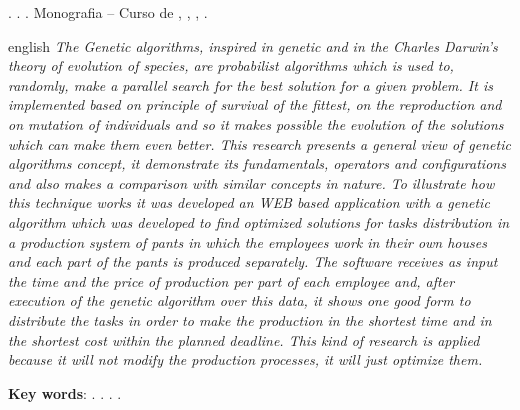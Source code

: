 
\begin{OnehalfSpacing} 

\noindent \imprimirAutorCitacaoMaiuscula. {\bfseries\imprimirtitulo}. {\imprimirdata}.  Monografia -- Curso de {\MakeUppercase\imprimircurso}, {\imprimirinstituicao}, {\imprimirlocal}, {\imprimirdata}.

\vspace{\onelineskip}
\vspace{\onelineskip}
\vspace{\onelineskip}
\vspace{\onelineskip}

\begin{resumo}[Abstract]%
\begin{otherlanguage*}{english}%
\textit{
\noindent The Genetic algorithms, inspired in genetic and in the Charles Darwin's theory of evolution of species,
are probabilist algorithms which is used to, randomly, make a parallel search for the best solution for a given problem. 
It is implemented based on principle of survival of the fittest, on the reproduction and on mutation of individuals and 
so it makes possible the evolution of the solutions which can make them even better. This research presents a general view 
of genetic algorithms concept, it demonstrate its fundamentals, operators and configurations and also makes a comparison 
with similar concepts in nature. To illustrate how this technique works it was developed an WEB based application with a 
genetic algorithm which was developed to find optimized solutions for tasks distribution in a production system of pants in 
which the employees work in their own houses and each part of the pants is produced separately. The software receives as 
input the time and the price of production per part of each employee and, after execution of the genetic algorithm over 
this data, it shows one good form to distribute the tasks in order to make the production in the shortest time and in the 
shortest cost within the planned deadline. This kind of research is applied because it will not modify the production processes, 
it will just optimize them.
}

\vspace{\onelineskip}
\vspace*{\fill}
\noindent \textbf{Key words}: \imprimirKeyWordOne. \imprimirKeyWordTwo. \imprimirKeyWordThree. \imprimirKeyWordFour.
\end{otherlanguage*}
\vspace{\onelineskip}
\end{resumo}

\end{OnehalfSpacing}
